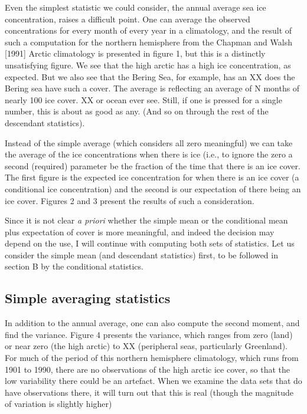   Even the simplest statistic we could consider, the annual average sea ice
concentration, raises a difficult point.  One can average the observed 
concentrations for every month of every year in a climatology, and the
result of such a computation for the northern hemisphere from the Chapman
and Walsh [1991] Arctic climatology is presented in figure 1, but this is
a distinctly unsatisfying figure.  We see that the high arctic has a high
ice concentration, as expected.  But we also see that the Bering Sea, for
example, has an XX%
does the Bering sea have such a cover.  The average is reflecting an average
of N months of nearly 100%
ice cover.  XX%
or ocean ever see.  Still, if one is pressed for a single number, this
is about as good as any.  (And so on through the rest of the descendant
statistics).

  Instead of the simple average (which considers all zero %
meaningful) we can take the average of the ice concentrations when there
is ice (i.e., to ignore the zero %
a second (required) parameter be the fraction of the time that there is
an ice cover.  The first figure is the expected ice concentration for when
there is an ice cover (a conditional ice concentration) and the second is
our expectation of there being an ice cover.  Figures 2 and 3 present the
results of such a consideration.  

  Since it is not clear {\it a priori} whether the simple mean or the conditional
mean plus expectation of cover is more meaningful, and indeed the decision
may depend on the use, I will continue with computing both sets of statistics.
Let us consider the simple mean (and descendant statistics) first, to be
followed in section B by the conditional statistics.

\subsection{Simple averaging statistics}

  In addition to the annual average, one can also compute the second moment,
and find the variance.  Figure 4 presents the variance, which ranges from zero
(land) or near zero (the high arctic) to XX (peripheral seas, particularly
Greenland).  For much of the period of this northern hemisphere climatology,
which runs from 1901 to 1990, there are no observations of the high arctic
ice cover, so that the low variability there could be an artefact.  When we
examine the data sets that do have observations there, it will turn out
that this is real (though the magnitude of variation is slightly higher)

